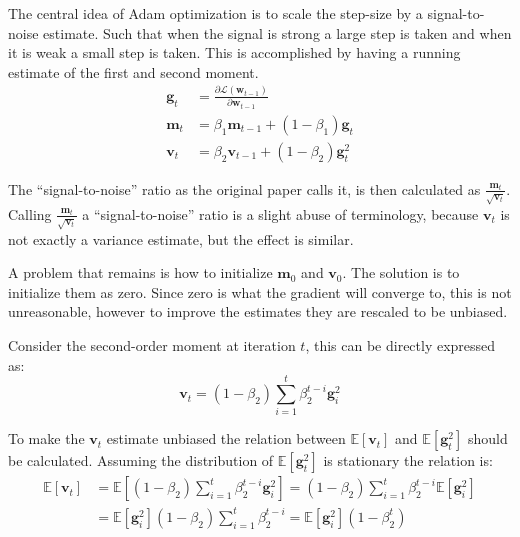 The central idea of Adam optimization is to scale the step-size by a signal-to-noise estimate. Such that when the signal is strong a large step is taken and when it is weak a small step is taken. This is accomplished by having a running estimate of the first and second moment.
\begin{equation}
\begin{aligned}
\mathbf{g}_t &= \frac{\partial \mathcal{L}(\mathbf{w}_{t-1})}{\partial \mathbf{w}_{t-1}} \\
\mathbf{m}_t &= \beta_1 \mathbf{m}_{t-1} + (1 - \beta_1) \mathbf{g}_t \\
\mathbf{v}_t &= \beta_2 \mathbf{v}_{t-1} + (1 - \beta_2) \mathbf{g}_t^2
\end{aligned}
\end{equation}

The ``signal-to-noise'' ratio as the original paper \cite{adam-optimization} calls it, is then calculated as $\frac{\mathbf{m}_t}{\sqrt{\mathbf{v}_t}}$. Calling  $\frac{\mathbf{m}_t}{\sqrt{\mathbf{v}_t}}$ a ``signal-to-noise'' ratio is a slight abuse of terminology, because $\mathbf{v}_t$ is not exactly a variance estimate, but the effect is similar.

A problem that remains is how to initialize $\mathbf{m}_{0}$ and $\mathbf{v}_{0}$. The solution is to initialize them as zero. Since zero is what the gradient will converge to, this is not unreasonable, however to improve the estimates they are rescaled to be unbiased.

Consider the second-order moment at iteration $t$, this can be directly expressed as:
\begin{equation}
\mathbf{v}_t = (1 - \beta_2)\sum_{i=1}^t \beta_2^{t-i} \mathbf{g}_{i}^2
\end{equation}

To make the $\mathbf{v}_t$ estimate unbiased the relation between $\mathbb{E}[\mathbf{v}_t]$ and $\mathbb{E}[\mathbf{g}_t^2]$ should be calculated. Assuming the distribution of $\mathbb{E}[\mathbf{g}_t^2]$ is stationary the relation is: 
\begin{equation}
\begin{aligned}
\mathbb{E}[\mathbf{v}_t] &= \mathbb{E}\left[(1 - \beta_2)\sum_{i=1}^t \beta_2^{t-i} \mathbf{g}_{i}^2\right]
= (1 - \beta_2)\sum_{i=1}^t \beta_2^{t-i} \mathbb{E}\left[\mathbf{g}_{i}^2\right] \\
&= \mathbb{E}\left[\mathbf{g}_{i}^2\right] (1 - \beta_2)\sum_{i=1}^t \beta_2^{t-i}
= \mathbb{E}\left[\mathbf{g}_{i}^2\right] (1 - \beta_2^t)
\end{aligned}
\end{equation}

